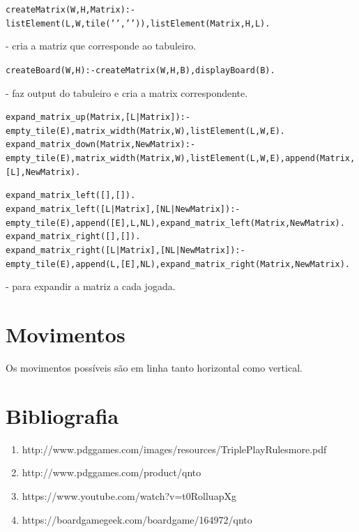 \documentclass[a4paper]{article}
\begin{document}
\begin{alltt}
	createMatrix(W, H, Matrix) :- listElement(L,W,tile(' ',' ')), \newline listElement(Matrix,H,L). 
\end{alltt}
		\normalfont - cria a matriz que corresponde ao tabuleiro.

\begin{alltt}
	createBoard(W,H) :- createMatrix(W,H, B), displayBoard(B).
\end{alltt}
		\normalfont - faz output do tabuleiro e cria a matrix correspondente.
\begin{alltt}
	expand_matrix_up(Matrix, [L|Matrix]) :- empty_tile( E ), \newline matrix_width(Matrix, W), listElement(L, W, E).
	expand_matrix_down(Matrix, NewMatrix) :- empty_tile( E ), \newline matrix_width(Matrix, W), listElement(L, W, E),\newline append(Matrix, [L], NewMatrix).

	expand_matrix_left([],[]).
	expand_matrix_left([L|Matrix], [NL|NewMatrix]):- empty_tile( E ), \newline append([E], L, NL), expand_matrix_left(Matrix, NewMatrix).
	expand_matrix_right([],[]).
	expand_matrix_right([L|Matrix], [NL|NewMatrix]):- empty_tile( E ), \newline append(L, [E], NL), expand_matrix_right(Matrix, NewMatrix). 
\end{alltt}
		\normalfont - para expandir a matriz a cada jogada. 


\section{Movimentos}

Os movimentos possíveis são em linha tanto horizontal como vertical. 

\section{Bibliografia}

\begin{enumerate}
	\item http://www.pdggames.com/images/resources/TriplePlayRulesmore.pdf
	\item http://www.pdggames.com/product/qnto
	\item https://www.youtube.com/watch?v=t0RolluapXg
	\item https://boardgamegeek.com/boardgame/164972/qnto
\end{enumerate}
\end{document}
